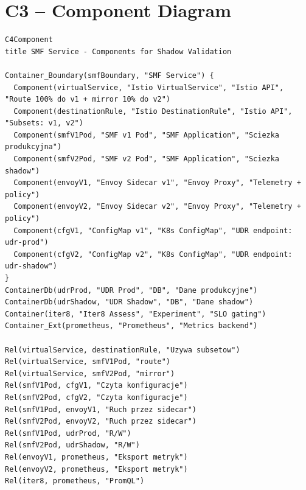 \section{C3 -- Component Diagram}
\begin{lstlisting}[basicstyle=\footnotesize\ttfamily,caption=C3 Component Diagram w Mermaid,label=lst:c3-mermaid]
C4Component
title SMF Service - Components for Shadow Validation

Container_Boundary(smfBoundary, "SMF Service") {
  Component(virtualService, "Istio VirtualService", "Istio API", "Route 100% do v1 + mirror 10% do v2")
  Component(destinationRule, "Istio DestinationRule", "Istio API", "Subsets: v1, v2")
  Component(smfV1Pod, "SMF v1 Pod", "SMF Application", "Sciezka produkcyjna")
  Component(smfV2Pod, "SMF v2 Pod", "SMF Application", "Sciezka shadow")
  Component(envoyV1, "Envoy Sidecar v1", "Envoy Proxy", "Telemetry + policy")
  Component(envoyV2, "Envoy Sidecar v2", "Envoy Proxy", "Telemetry + policy")
  Component(cfgV1, "ConfigMap v1", "K8s ConfigMap", "UDR endpoint: udr-prod")
  Component(cfgV2, "ConfigMap v2", "K8s ConfigMap", "UDR endpoint: udr-shadow")
}
ContainerDb(udrProd, "UDR Prod", "DB", "Dane produkcyjne")
ContainerDb(udrShadow, "UDR Shadow", "DB", "Dane shadow")
Container(iter8, "Iter8 Assess", "Experiment", "SLO gating")
Container_Ext(prometheus, "Prometheus", "Metrics backend")

Rel(virtualService, destinationRule, "Uzywa subsetow")
Rel(virtualService, smfV1Pod, "route")
Rel(virtualService, smfV2Pod, "mirror")
Rel(smfV1Pod, cfgV1, "Czyta konfiguracje")
Rel(smfV2Pod, cfgV2, "Czyta konfiguracje")
Rel(smfV1Pod, envoyV1, "Ruch przez sidecar")
Rel(smfV2Pod, envoyV2, "Ruch przez sidecar")
Rel(smfV1Pod, udrProd, "R/W")
Rel(smfV2Pod, udrShadow, "R/W")
Rel(envoyV1, prometheus, "Eksport metryk")
Rel(envoyV2, prometheus, "Eksport metryk")
Rel(iter8, prometheus, "PromQL")
\end{lstlisting}

